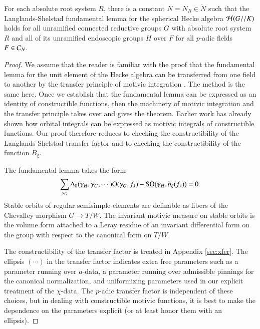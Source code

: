 \begin{theorem} \label{thm:fl} For each absolute root system $R$,
  there is a constant $N=N_R\in\ring{N}$ such that the
  Langlands-Shelstad fundamental lemma for the spherical Hecke algebra
  $\mathcal H(G//K)$ holds for all unramified connected reductive groups $G$
  with absolute root system $R$ and all of its unramified endoscopic
  groups $H$ over $F$ for all $p$-adic fields $F\in \mathcal C_N$.
\end{theorem}


\begin{proof}
  We assume that the reader is familiar with the proof that the
  fundamental lemma for the unit element of the Hecke algebra can be
  transferred from one field to another by the transfer principle of
  motivic integration \cite{cluckers2011transfer}.  The method is the
  same here.  Once we establish that the fundamental lemma can be
  expressed as an identity of constructible functions, then the
  machinery of motivic integration and the transfer principle takes
  over and gives the theorem.  Earlier work has already shown how
  orbital integrals can be expressed as motivic integrals of
  constructible functions.  Our proof therefore reduces to checking
  the constructibility of the Langlands-Shelstad transfer factor and
  to checking the constructibility of the function $B_\xi$.

  The fundamental lemma takes the form
\begin{equation}\label{eqn:fl}
\sum_{\gamma_G}\Delta_0(\gamma_H,\gamma_G,\cdots)
{\operatorname{O}}(\gamma_G,f_\lambda) - {\operatorname{SO}}(\gamma_H,b_\xi(f_\lambda)) = 0.
\end{equation}
Stable orbits of regular semisimple elements are definable as fibers
of the Chevalley morphism $G\to T/W$.  The invariant motivic measure
on stable orbits is the volume form attached to a Leray residue of an
invariant differential form on the group with respect to the canonical
form on $T/W$.  

The constructibility of the transfer factor is treated in Appendix
\ref{sec:xfer}.  The ellipsis $(\cdots)$ in the transfer factor
indicates extra free parameters such as a parameter running over
$a$-data, a parameter running over admissible pinnings for the
canonical normalization, and uniformizing parameters used in our
explicit treatment of the $\chi$-data.  The $p$-adic transfer factor
is independent of these choices, but in dealing with constructible
motivic functions, it is best to make the dependence on the parameters
explicit (or at least honor them with an ellipsis).


\end{proof}
